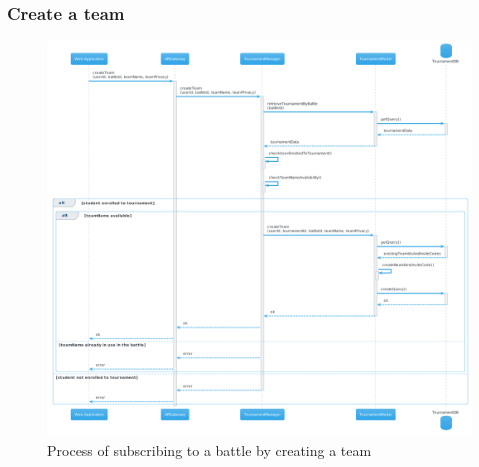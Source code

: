 \subsubsection{Create a team}
\begin{figure}[H]
    \hspace{-1.5cm}
    \includegraphics[width=1.2\textwidth]{Diagrams/sequence/create_team.png}
    \caption{Process of subscribing to a battle by creating a team}
\end{figure}

